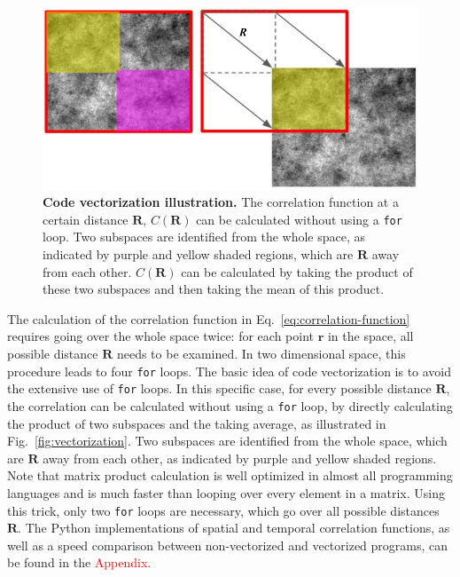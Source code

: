 \begin{figure}[!ht]
	\begin{center}
	\includegraphics[width=5.5in]{Figs/2-Exp/vectorization.pdf}
	\end{center}
	\caption[Code vectorization illustration]
	{
	\textbf{Code vectorization illustration.}
	The correlation function at a certain distance $\bm{R}$, $C(\bm{R})$ can be calculated without using a \texttt{for} loop. Two subspaces are identified from the whole space, as indicated by purple and yellow shaded regions, which are $\bm{R}$ away from each other. $C(\bm{R})$ can be calculated by taking the product of these two subspaces and then taking the mean of this product.
	}
	\label{fig:PIV}
\end{figure}


The calculation of the correlation function in Eq.~\ref{eq:correlation-function} requires going over the whole space twice: for each point $\bm{r}$ in the space, all possible distance $\bm{R}$ needs to be examined. In two dimensional space, this procedure leads to four \texttt{for} loops. The basic idea of code vectorization is to avoid the extensive use of \texttt{for} loops. In this specific case, for every possible distance $\bm{R}$, the correlation can be calculated without using a \texttt{for} loop, by directly calculating the product of two subspaces and the taking average, as illustrated in Fig.~\ref{fig:vectorization}. Two subspaces are identified from the whole space, which are $\bm{R}$ away from each other, as indicated by purple and yellow shaded regions. Note that matrix product calculation is well optimized in almost all programming languages and is much faster than looping over every element in a matrix. Using this trick, only two \texttt{for} loops are necessary, which go over all possible distances $\bm{R}$. The Python implementations of spatial and temporal correlation functions, as well as a speed comparison between non-vectorized and vectorized programs, can be found in the \textcolor{red}{Appendix}.

